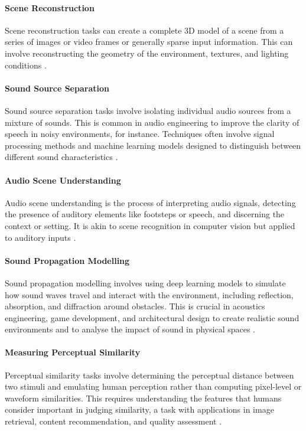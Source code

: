 \paragraph{Scene Reconstruction}
Scene reconstruction tasks can create a complete 3D model of a scene from a series of images or video frames or generally sparse input information. This can involve reconstructing the geometry of the environment, textures, and lighting conditions \citep{patow2003survey}.\par
\paragraph{Sound Source Separation}
Sound source separation tasks involve isolating individual audio sources from a mixture of sounds. This is common in audio engineering to improve the clarity of speech in noisy environments, for instance. Techniques often involve signal processing methods and machine learning models designed to distinguish between different sound characteristics \citep{virtanen2006sound}.\par
\paragraph{Audio Scene Understanding}
Audio scene understanding is the process of interpreting audio signals, detecting the presence of auditory elements like footsteps or speech, and discerning the context or setting. It is akin to scene recognition in computer vision but applied to auditory inputs \citep{abesser2020review}.\par
\paragraph{Sound Propagation Modelling}
Sound propagation modelling involves using deep learning models to simulate how sound waves travel and interact with the environment, including reflection, absorption, and diffraction around obstacles. This is crucial in acoustics engineering, game development, and architectural design to create realistic sound environments and to analyse the impact of sound in physical spaces \citep{liu2022sound}.\par
\paragraph{Measuring Perceptual Similarity}
Perceptual similarity tasks involve determining the perceptual distance between two stimuli and emulating human perception rather than computing pixel-level or waveform similarities. This requires understanding the features that humans consider important in judging similarity, a task with applications in image retrieval, content recommendation, and quality assessment \citep{Dolhasz_2020_CVPR}.\par
